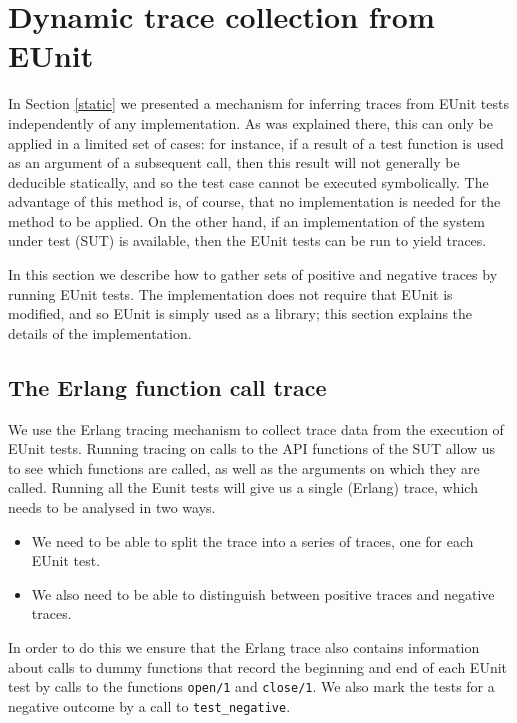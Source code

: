 \documentclass[]{sigplanconf}
\begin{document}
\section{Dynamic trace collection from EUnit}
\label{dynamic-collection}

In Section \ref{static} we presented a mechanism for inferring traces from EUnit tests independently of any implementation. As was explained there, this can only be applied in a limited set of cases: for instance, if a result of a test function is used as an argument of a subsequent call, then this result will not generally be deducible statically, and so the test case cannot be executed symbolically. The advantage of this method is, of course, that no implementation is needed  for the method to be applied.  
On the other hand, if an implementation of the system under test (SUT) is available, then the EUnit tests can be run to yield traces. 

In this section we describe how to gather sets of positive and negative traces by running EUnit tests. The implementation does not require that EUnit is modified, and so EUnit is simply used as a library; this section explains the details of the implementation.

\subsection{The Erlang function call trace}
\label{function-traces} 

We use the Erlang tracing mechanism to collect trace data from the execution of EUnit tests. Running tracing on calls to the API functions of the SUT allow us to see which functions are called, as well as the arguments on which they are called. Running all the Eunit tests will give us a single (Erlang) trace, which needs to be analysed in two ways.
\begin{itemize}
\item
We need to be able to split the trace into a series of traces, one for each EUnit test.
\item
We also need to be able to distinguish between positive traces and negative traces. 
\end{itemize}
In order to do this we ensure that the Erlang trace also contains information about calls to dummy functions that record the beginning and end of each EUnit test by calls to the functions \texttt{open/1} and \texttt{close/1}. We also mark the tests for a negative outcome by a call to \texttt{test\_negative}.
\end{document}
